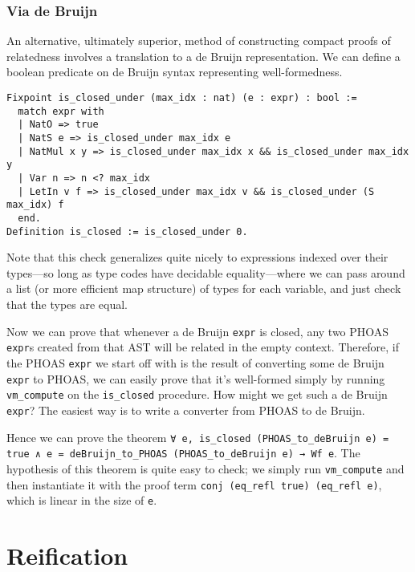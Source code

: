 
\subsubsection{Via de Bruijn} \label{sec:wf:perf:de-bruijn}

An alternative, ultimately superior, method of constructing compact proofs of relatedness involves a translation to a de Bruijn representation.
We can define a boolean predicate on de Bruijn syntax representing well-formedness.
\begin{verbatim}
Fixpoint is_closed_under (max_idx : nat) (e : expr) : bool :=
  match expr with
  | NatO => true
  | NatS e => is_closed_under max_idx e
  | NatMul x y => is_closed_under max_idx x && is_closed_under max_idx y
  | Var n => n <? max_idx
  | LetIn v f => is_closed_under max_idx v && is_closed_under (S max_idx) f
  end.
Definition is_closed := is_closed_under 0.
\end{verbatim}
Note that this check generalizes quite nicely to expressions indexed over their types---so long as type codes have decidable equality---where we can pass around a list (or more efficient map structure) of types for each variable, and just check that the types are equal.

Now we can prove that whenever a de Bruijn \texttt{expr} is closed, any two PHOAS \texttt{expr}s created from that AST will be related in the empty context.
Therefore, if the PHOAS \texttt{expr} we start off with is the result of converting some de Bruijn \texttt{expr} to PHOAS, we can easily prove that it's well-formed simply by running \texttt{vm_compute} on the \texttt{is_closed} procedure.
How might we get such a de Bruijn \texttt{expr}?
The easiest way is to write a converter from PHOAS to de Bruijn.

Hence we can prove the theorem \texttt{∀ e, is\_closed (PHOAS\_to\_deBruijn e) = true ∧ e = deBruijn\_to\_PHOAS (PHOAS\_to\_deBruijn e) → Wf e}.
The hypothesis of this theorem is quite easy to check; we simply run \texttt{vm_compute} and then instantiate it with the proof term \texttt{conj (eq_refl true) (eq_refl e)}, which is linear in the size of \texttt{e}.

\section{Reification} \label{sec:reif-survey}


